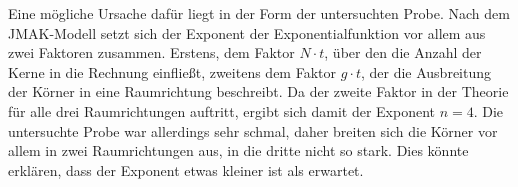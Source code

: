 \documentclass[
	a4paper,
	12pt,
	pagesize,
	ngerman
]{scrartcl}
\begin{document}
Eine mögliche Ursache dafür liegt in der Form der untersuchten Probe. Nach dem JMAK-Modell setzt sich der Exponent der Exponentialfunktion vor allem aus zwei Faktoren zusammen. Erstens, dem Faktor $N\cdot t$, über den die Anzahl der Kerne in die Rechnung einfließt, zweitens dem Faktor $g \cdot t$, der die Ausbreitung der Körner in eine Raumrichtung beschreibt. Da der zweite Faktor in der Theorie für alle drei Raumrichtungen auftritt, ergibt sich damit der Exponent $n=4$. Die untersuchte Probe war allerdings sehr schmal, daher breiten sich die Körner vor allem in zwei Raumrichtungen aus, in die dritte nicht so stark. Dies könnte erklären, dass der Exponent etwas kleiner ist als erwartet.
\end{document}
